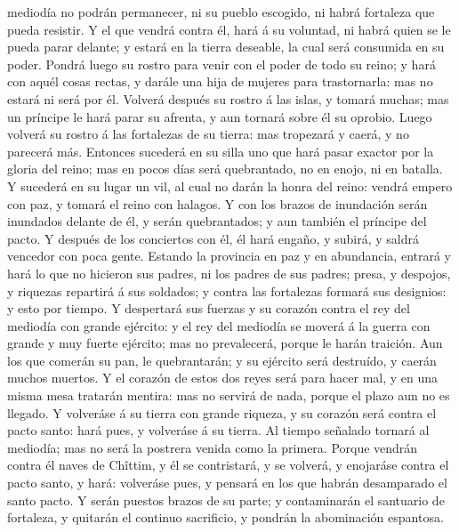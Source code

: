 mediodía no podrán permanecer, ni su pueblo escogido, ni habrá fortaleza
que pueda resistir.  Y el que vendrá contra él, hará á su
voluntad, ni habrá quien se le pueda parar delante; y estará en la
tierra deseable, la cual será consumida en su poder. 
Pondrá luego su rostro para venir con el poder de todo su reino; y hará
con aquél cosas rectas, y darále una hija de mujeres para trastornarla:
mas no estará ni será por él.  Volverá después su rostro
á las islas, y tomará muchas; mas un príncipe le hará parar su afrenta,
y aun tornará sobre él su oprobio.  Luego volverá su
rostro á las fortalezas de su tierra: mas tropezará y caerá, y no
parecerá más.  Entonces sucederá en su silla uno que hará
pasar exactor por la gloria del reino; mas en pocos días será
quebrantado, no en enojo, ni en batalla.  Y sucederá en
su lugar un vil, al cual no darán la honra del reino: vendrá empero con
paz, y tomará el reino con halagos.  Y con los brazos de
inundación serán inundados delante de él, y serán quebrantados; y aun
también el príncipe del pacto.  Y después de los
conciertos con él, él hará engaño, y subirá, y saldrá vencedor con poca
gente.  Estando la provincia en paz y en abundancia,
entrará y hará lo que no hicieron sus padres, ni los padres de sus
padres; presa, y despojos, y riquezas repartirá á sus soldados; y contra
las fortalezas formará sus designios: y esto por tiempo. 
Y despertará sus fuerzas y su corazón contra el rey del mediodía con
grande ejército: y el rey del mediodía se moverá á la guerra con grande
y muy fuerte ejército; mas no prevalecerá, porque le harán traición.
 Aun los que comerán su pan, le quebrantarán; y su
ejército será destruído, y caerán muchos muertos.  Y el
corazón de estos dos reyes será para hacer mal, y en una misma mesa
tratarán mentira: mas no servirá de nada, porque el plazo aun no es
llegado.  Y volveráse á su tierra con grande riqueza, y
su corazón será contra el pacto santo: hará pues, y volveráse á su
tierra.  Al tiempo señalado tornará al mediodía; mas no
será la postrera venida como la primera.  Porque vendrán
contra él naves de Chîttim, y él se contristará, y se volverá, y
enojaráse contra el pacto santo, y hará: volveráse pues, y pensará en
los que habrán desamparado el santo pacto.  Y serán
puestos brazos de su parte; y contaminarán el santuario de fortaleza, y
quitarán el continuo sacrificio, y pondrán la abominación espantosa.
